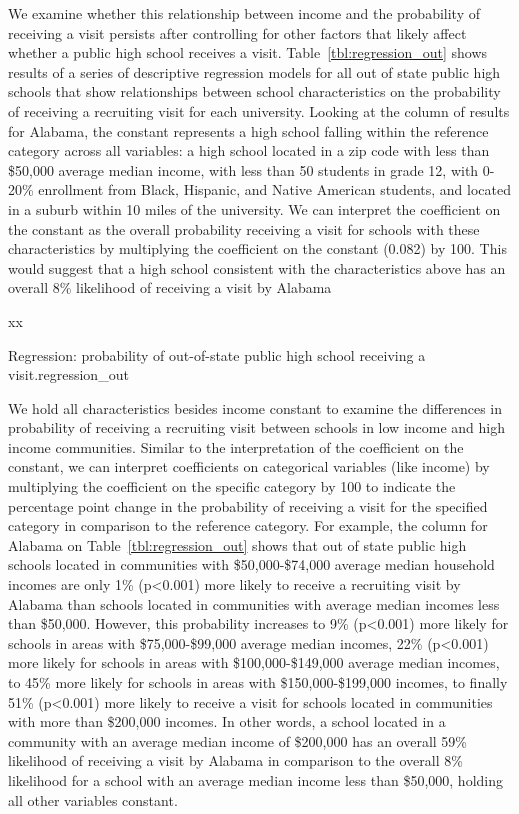 \documentclass[twoside]{article}
\begin{document}
We examine whether this relationship between income and the probability of receiving a visit persists after controlling for other factors that likely affect whether a public high school receives a visit. Table~\ref{tbl:regression_out} shows results of a series of descriptive regression models for all out of state public high schools that show relationships between school characteristics on the probability of receiving a recruiting visit for each university. Looking at the column of results for Alabama, the constant represents a high school falling within the reference category across all variables: a high school located in a zip code with less than \$50,000 average median income, with less than 50 students in grade 12, with 0-20\% enrollment from Black, Hispanic, and Native American students, and located in a suburb within 10 miles of the university.  We can interpret the coefficient on the constant as the overall probability receiving a visit for schools with these characteristics by multiplying the coefficient on the constant (0.082) by 100. This would suggest that a high school consistent with the characteristics above has an overall 8\% likelihood of receiving a visit by Alabama 

\begin{table-env}[8]{x}{x}
  
\end{table-env}

\begin{table-env}[8]{Regression: probability of out-of-state public high school receiving a visit.}{regression_out}
  
\end{table-env}

We hold all characteristics besides income constant to examine the differences in probability of receiving a recruiting visit between schools in low income and high income communities. Similar to the interpretation of the coefficient on the constant, we can interpret coefficients on categorical variables (like income) by multiplying the coefficient on the specific category by 100 to indicate the percentage point change in the probability of receiving a visit for the specified category in comparison to the reference category. For example, the column for Alabama on Table~\ref{tbl:regression_out} shows that out of state public high schools located in communities with \$50,000-\$74,000 average median household incomes are only 1\% (p<0.001) more likely to receive a recruiting visit by Alabama than schools located in communities with average median incomes less than \$50,000. However, this probability increases to 9\%  (p<0.001) more likely for schools in areas with \$75,000-\$99,000 average median incomes, 22\%  (p<0.001) more likely for schools in areas with \$100,000-\$149,000 average median incomes, to 45\% more likely for schools in areas with \$150,000-\$199,000 incomes, to finally 51\% (p<0.001) more likely to receive a visit for schools located in communities with more than \$200,000 incomes. In other words, a school located in a community with an average median income of \$200,000 has an overall 59\% likelihood of receiving a visit by Alabama in comparison to the overall 8\% likelihood for a school with an average median income less than \$50,000, holding all other variables constant.
\end{document}
